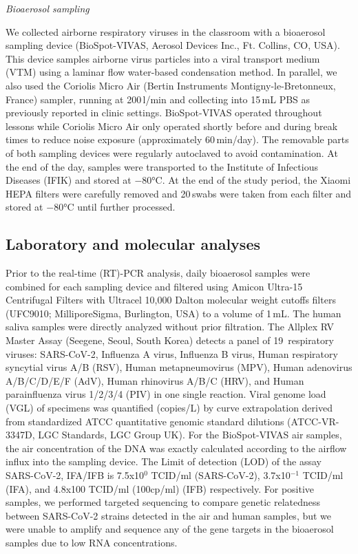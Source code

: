 \documentclass[fleqn,11pt]{wlscirep}
\begin{document}
\noindent \emph{Bioaerosol sampling} 

\noindent We collected airborne respiratory viruses in the classroom with a bioaerosol sampling device (BioSpot-VIVAS, Aerosol Devices Inc., Ft. Collins, CO, USA). This device samples airborne virus particles into a viral transport medium (VTM) using a laminar flow water-based condensation method. In parallel, we also used the Coriolis Micro Air (Bertin Instruments Montigny-le-Bretonneux, France) sampler, running at 200\,l/min and collecting into 15\,mL PBS  as previously reported in clinic settings\cite{Moore2021}. BioSpot-VIVAS operated throughout lessons while Coriolis Micro Air only operated shortly before and during break times to reduce noise exposure (approximately 60\,min/day). The removable parts of both sampling devices were regularly autoclaved to avoid contamination. At the end of the day, samples were transported to the Institute of Infectious Diseases (IFIK) and stored at $-$80°C. At the end of the study period, the Xiaomi HEPA filters were carefully removed and 20\,swabs were taken from each filter and stored at $-$80°C until further processed. \medskip

\subsection{Laboratory and molecular analyses}\label{sec:mol_analyses}

\noindent Prior to the real-time (RT)-PCR analysis, daily bioaerosol samples were combined for each sampling device and filtered using Amicon Ultra-15 Centrifugal Filters with Ultracel 10,000 Dalton molecular weight cutoffs filters (UFC9010; MilliporeSigma, Burlington, USA) to a volume of 1\,mL. The human saliva samples were directly analyzed without prior filtration. The Allplex RV Master Assay (Seegene, Seoul, South Korea) detects a panel of 19~respiratory viruses: SARS-CoV-2, Influenza A virus, Influenza B virus, Human respiratory syncytial virus A/B (RSV), Human metapneumovirus (MPV), Human adenovirus A/B/C/D/E/F (AdV), Human rhinovirus A/B/C (HRV), and Human parainfluenza virus 1/2/3/4 (PIV) in one single reaction. Viral genome load (VGL) of specimens was quantified (copies/L) by curve extrapolation derived from standardized ATCC quantitative genomic standard dilutions (ATCC-VR-3347D, LGC Standards, LGC Group UK). For the BioSpot-VIVAS air samples, the air concentration of the DNA was exactly calculated according to the airflow influx into the sampling device. The Limit of detection (LOD) of the assay SARS-CoV-2, IFA/IFB is 7.5x10$^0$ TCID/ml (SARS-CoV-2), 3.7x10$^{-1}$ TCID/ml (IFA), and 4.8x100 TCID/ml (100cp/ml) (IFB) respectively. For positive samples, we performed targeted sequencing to compare genetic relatedness between SARS-CoV-2 strains detected in the air and human samples\cite{Goncalves2021}, but we were unable to amplify and sequence any of the gene targets in the bioaerosol samples due to low RNA concentrations. 
\end{document}
